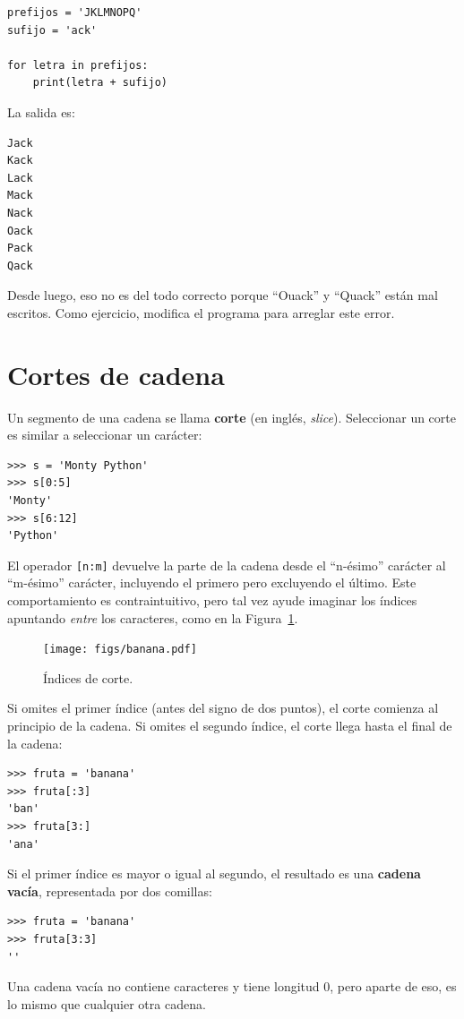 \documentclass[10pt]{book}
\begin{document}
\begin{verbatim}
prefijos = 'JKLMNOPQ'
sufijo = 'ack'

for letra in prefijos:
    print(letra + sufijo)
\end{verbatim}
%
La salida es:

\begin{verbatim}
Jack
Kack
Lack
Mack
Nack
Oack
Pack
Qack
\end{verbatim}
%
Desde luego, eso no es del todo correcto porque ``Ouack'' y ``Quack'' están
mal escritos.  Como ejercicio, modifica el programa para arreglar este error.



\section{Cortes de cadena}
\label{slice}
  
  

Un segmento de una cadena se llama {\bf corte} (en inglés, {\em slice}).  Seleccionar un corte es
similar a seleccionar un carácter:

\begin{verbatim}
>>> s = 'Monty Python'
>>> s[0:5]
'Monty'
>>> s[6:12]
'Python'
\end{verbatim}
%
El operador {\tt [n:m]} devuelve la parte de la cadena desde el 
``n-ésimo'' carácter al ``m-ésimo'' carácter, incluyendo el primero pero
excluyendo el último.  Este comportamiento es contraintuitivo, pero tal vez
ayude imaginar los índices apuntando {\em entre} los
caracteres, como en la Figura~\ref{fig.banana}.

\begin{figure}
\centerline
{\texttt{[image: figs/banana.pdf]}}
\caption{Índices de corte.}
\label{fig.banana}
\end{figure}

Si omites el primer índice (antes del signo de dos puntos), el corte comienza al
principio de la cadena.  Si omites el segundo índice, el corte
llega hasta el final de la cadena:

\begin{verbatim}
>>> fruta = 'banana'
>>> fruta[:3]
'ban'
>>> fruta[3:]
'ana'
\end{verbatim}
%
Si el primer índice es mayor o igual al segundo, el resultado
es una {\bf cadena vacía}, representada por dos comillas:

\begin{verbatim}
>>> fruta = 'banana'
>>> fruta[3:3]
''
\end{verbatim}
%
Una cadena vacía no contiene caracteres y tiene longitud 0, pero aparte
de eso, es lo mismo que cualquier otra cadena.
\end{document}
